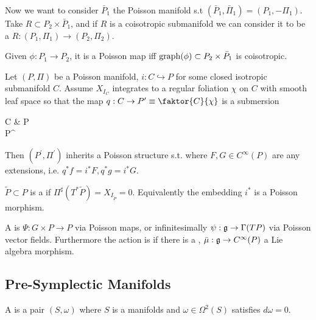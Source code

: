 \documentclass{article}
\begin{document}
Now we want to consider $\bar{P}_1$ the Poisson manifold s.t $(\bar{P}_1, \bar{\Pi}_1) = (P_1, -\Pi_1)$. Take $R \subset P_2 \times \bar{P}_1$, and if $R$ is a coisotropic submanifold we can consider it to be a  $R : (P_1, \Pi_1) \to (P_2, \Pi_2)$. 

\begin{prop}
Given $\phi:P_1 \to P_2$, it is a Poisson map iff $\operatorname{graph}(\phi) \subset P_2 \times \bar{P}_1$ is coisotropic. 
\end{prop}

\begin{theorem}
Let $(P,\Pi)$ be a Poisson manifold, $i:C \hookrightarrow P$ for some closed isotropic submanifold $C$. Assume $X_{I_C}$ integrates to a regular foliation $\chi$ on $C$ with smooth leaf space so that the map $q : C \to P^\prime \equiv \faktor{C}{\chi}$ is a submersion
\begin{tkz}
C \arrow[r,"i",hook]   & P \\ P^\prime  
\end{tkz}
Then $(P^\prime, \Pi^\prime)$ inherits a Poisson structure s.t. 
where $F,G \in C^\infty(P)$ are any extensions, i.e. $q^\ast f = i^\ast F, q^\ast g = i^\ast G$. 
\end{theorem}

\begin{definition}
$\tilde{P} \subset P$ is a  if $\Pi^\sharp(T^\ast\tilde{P}) = X_{I_{\tilde{P}}} = 0 $. Equivalently the embedding $i^\ast$ is a Poisson morphism. 
\end{definition}

\begin{definition}
A  is $\Psi : G \times P \to P$ via Poisson maps, or infinitesimally $\psi : \mathfrak{g} \to \Gamma(TP)$ via Poisson vector fields. Furthermore the action is  if there is a , $\bar{\mu} : \mathfrak{g} \to C^\infty(P)$ a Lie algebra morphism. 
\end{definition}

\subsection{Pre-Symplectic Manifolds}

\begin{definition}
A  is a pair $(S,\omega)$ where $S$ is a manifolds and $\omega \in \Omega^2(S)$ satisfies $d\omega = 0$. 
\end{definition}
\end{document}
